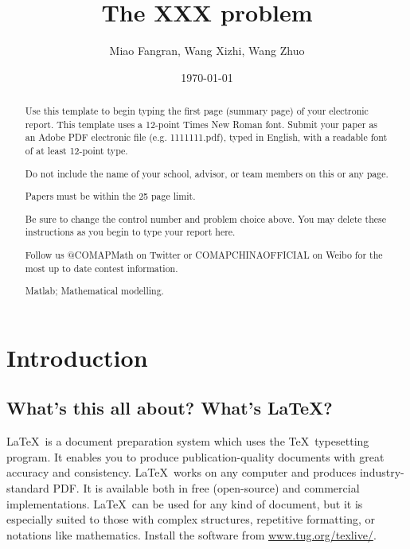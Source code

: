 \documentclass{mcmthesis}
\title{The XXX problem}
\author{Miao Fangran, Wang Xizhi, Wang Zhuo}
\date{\today}
\begin{document}
\begin{abstract}
Use this template to begin typing the first page (summary page) of your electronic report. This template uses a 12-point Times New Roman font. Submit your paper as an Adobe PDF electronic file (e.g. 1111111.pdf), typed in English, with a readable font of at least 12-point type.

Do not include the name of your school, advisor, or team members on this or any page.

Papers must be within the 25 page limit.

Be sure to change the control number and problem choice above.
You may delete these instructions as you begin to type your report here.

Follow us @COMAPMath on Twitter or COMAPCHINAOFFICIAL on Weibo for the most up to date contest information.

\begin{keywords}
Matlab; Mathematical modelling.
\end{keywords}
\end{abstract}
\maketitle
\tableofcontents
\newpage
\section{Introduction}
\subsection{What's this all about? What's \LaTeX?}
\LaTeX\ is a document preparation system which uses the \TeX\
typesetting program. It enables you to produce
publication-quality documents with great accuracy and
consistency. \LaTeX\ works on any computer and produces
industry-standard PDF. It is available both in free (open-source)
and commercial implementations. \LaTeX\ can be used for any kind
of document, but it is especially suited to those with complex
structures, repetitive formatting, or notations like
mathematics. Install the software from
\url{www.tug.org/texlive/}.
\end{document}
